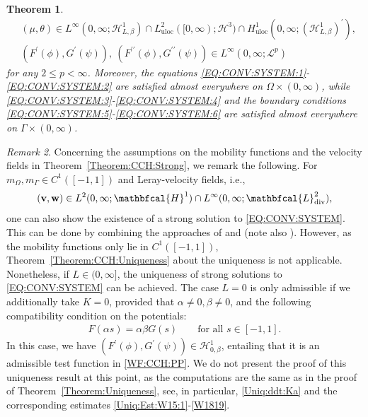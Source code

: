 \documentclass[10pt,reqno]{amsart}
\newtheorem{theorem}{Theorem}[section]
\theoremstyle{remark}
\newtheorem{remark}[theorem]{Remark}
\numberwithin{equation}{section}
\newcommand{\bv}{\mathbf{v}}
\newcommand{\bw}{\mathbf{w}}
\newcommand{\Div}{\textnormal{div}}
\newcommand{\Om}{\Omega}
\newcommand{\Ga}{\Gamma}
\begin{document}
\begin{theorem}
\begin{align*}
        &(\mu,\theta)\in L^\infty(0,\infty;\mathcal{H}^1_{L,\beta})\cap L^2_{\mathrm{uloc}}([0,\infty);\mathcal{H}^3)\cap H^1_{\mathrm{uloc}}(0,\infty;(\mathcal{H}^1_{L,\beta})^\prime), \\
        &(F^\prime(\phi),G^\prime(\psi)), \ (F^{\prime\prime}(\phi), G^{\prime\prime}(\psi))\in L^\infty(0,\infty;\mathcal{L}^p)
    \end{align*}
    for any $2 \leq p < \infty$. Moreover, the equations \eqref{EQ:CONV:SYSTEM:1}-\eqref{EQ:CONV:SYSTEM:2} are satisfied almost everywhere on $\Om\times(0,\infty)$, while \eqref{EQ:CONV:SYSTEM:3}-\eqref{EQ:CONV:SYSTEM:4} and the boundary conditions \eqref{EQ:CONV:SYSTEM:5}-\eqref{EQ:CONV:SYSTEM:6} are satisfied almost everywhere on $\Ga\times(0,\infty)$.
\end{theorem}

\begin{remark}\label{REM:REG:WEAK}
    Concerning the assumptions on the mobility functions and the velocity fields in Theorem~\ref{Theorem:CCH:Strong}, we remark the following. For $m_\Om, m_\Ga\in C^1([-1,1])$ and Leray-velocity fields, i.e., 
    \begin{align*}
        (\bv,\bw)\in L^2(0,\infty;\mathbfcal{H}^1)\cap L^\infty(0,\infty;\mathbfcal{L}^2_\Div),
    \end{align*}
    one can also show the existence of a strong solution to \eqref{EQ:CONV:SYSTEM}. This can be done by combining the approaches of \cite[Theorem~3.6]{Giorgini2025} and \cite[Theorem~3.4]{Stange2025} (note also \cite[Remark~3.7]{Giorgini2025}). However, as the mobility functions only lie in $C^1([-1,1])$, Theorem~\ref{Theorem:CCH:Uniqueness} about the uniqueness is not applicable. Nonetheless, if $L\in(0,\infty]$, the uniqueness of strong solutions to \eqref{EQ:CONV:SYSTEM} can be achieved. The case $L = 0$ is only admissible if we additionally take $K = 0$, provided that $\alpha\neq 0, \beta\neq 0$, and the following compatibility condition on the potentials:
    \begin{align*}
        F(\alpha s) = \alpha\beta G(s) \qquad\text{for all~}s\in[-1,1].
    \end{align*}
    In this case, we have $(F^\prime(\phi),G^\prime(\psi))\in\mathcal{H}^1_{0,\beta}$, entailing that it is an admissible test function in \eqref{WF:CCH:PP}. We do not present the proof of this uniqueness result at this point, as the computations are the same as in the proof of Theorem~\ref{Theorem:Uniqueness}, see, in particular, \eqref{Uniq:ddt:Ka} and the corresponding estimates \eqref{Uniq:Est:W15:1}-\eqref{W1819}.
\end{remark}
\end{document}

